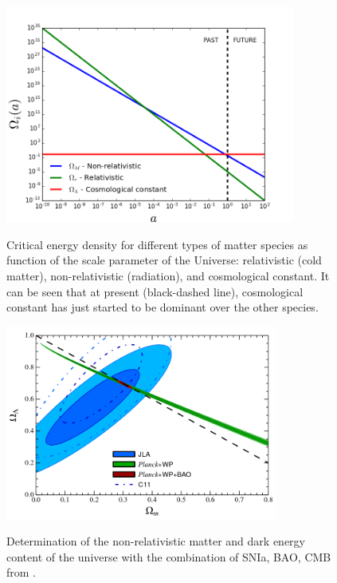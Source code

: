 \begin{figure}
\begin{center}
\includegraphics[width=0.85\textwidth]{./Pictures/rho_a.png}
\caption{Critical energy density for different types of matter species as function of the scale parameter of the Universe: relativistic (cold matter), non-relativistic (radiation), and cosmological constant. It can be seen that at present (black-dashed line), cosmological constant has just started to be dominant over the other species.}
\label{fig:rho_de}
\vspace*{0.2cm}
\includegraphics[width=0.8\textwidth]{./Pictures/om_ol.png}
\caption{Determination of the non-relativistic matter and dark energy content of the universe with the combination of SNIa, BAO, CMB from \cite{2014A&A...568A..22B}.}
\label{fig:om_ol}
\end{center}
\end{figure}
\newline

